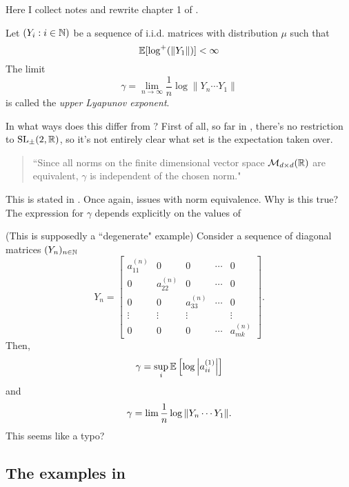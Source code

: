 
Here I collect notes and rewrite chapter 1 of \cite{bougerol2012products}.
\begin{definition}
	Let $(Y_i : i \in \mathbb{N})$ be a sequence of i.i.d. matrices with distribution $\mu$ such that
	\[
	\mathbb{E} [ \log^+ (\lVert Y_1 \rVert)]  < \infty
	\]
	The limit
	\[
	\gamma = \lim_{n \to \infty} \frac{1}{n} \log \lVert Y_n \cdots Y_1 \rVert 
	\]
	is called the \textit{upper Lyapunov exponent}.
	\begin{note}
		In what ways does this differ from \cite{bochi2016furstenberg}? First of all, so far in \cite{bougerol2012products}, there's no restriction to $\operatorname{SL}_{\pm}(2, \mathbb{R})$, so it's not entirely clear what set is the expectation taken over.
	\end{note}

\begin{note}
\begin{quote}
	``Since all norms on the finite dimensional vector space $\mathcal{M}_{d \times d}(\mathbb{R})$ are equivalent, $\gamma$ is independent of the chosen norm."
\end{quote}
This is stated in \cite{bougerol2012products}. Once again, issues with norm equivalence. Why is this true? The expression for $\gamma$ depends explicitly on the values of 
\end{note}

\begin{example} (This is supposedly a ``degenerate" example)
Consider a sequence of diagonal matrices $(Y_n)_{n \in \mathbb{N}}$
\[
Y_n = 
\begin{bmatrix}
	a_{11}^{(n)} & 0  & 0 & \cdots & 0  \\
	0 & a_{22} ^{(n)}& 0 & \cdots & 0 \\
	0 & 0 & a_{33} ^{(n)}& \cdots & 0 \\
	\vdots & \vdots & \vdots & & \vdots \\
	0 & 0& 0 & \cdots & a_{mk}^{(n)}
\end{bmatrix}.
\]
Then,
 \[
\gamma = \sup_i \mathbb{E} \left [ \log \abs{a_{ii}^{(1)}} \right]
\]
and
 \[
\gamma = \lim \frac{1}{n} \log \norm{Y_n \cdots Y_1 }.
\]
This seems like a typo?
\end{example}
\end{definition}



\subsection{The examples in \cite{bochi2016furstenberg}}


